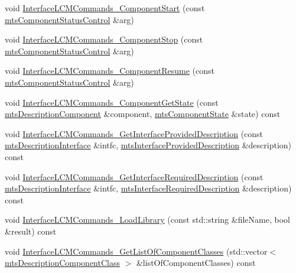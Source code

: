 \begin{DoxyCompactItemize}
\item 
void \hyperlink{classmts_manager_component_client_aa4241a0b7f26c01813bf25f3b720d4c8}{Interface\+L\+C\+M\+Commands\+\_\+\+Component\+Start} (const \hyperlink{classmts_component_status_control}{mts\+Component\+Status\+Control} \&arg)
\item 
void \hyperlink{classmts_manager_component_client_a96cc2f0e018d2ce86954aa69b1cd295a}{Interface\+L\+C\+M\+Commands\+\_\+\+Component\+Stop} (const \hyperlink{classmts_component_status_control}{mts\+Component\+Status\+Control} \&arg)
\item 
void \hyperlink{classmts_manager_component_client_a824231e5ba9b118b7c5386ff43a21ceb}{Interface\+L\+C\+M\+Commands\+\_\+\+Component\+Resume} (const \hyperlink{classmts_component_status_control}{mts\+Component\+Status\+Control} \&arg)
\item 
void \hyperlink{classmts_manager_component_client_a08e7f4f67ce5abb34704414d0a366630}{Interface\+L\+C\+M\+Commands\+\_\+\+Component\+Get\+State} (const \hyperlink{classmts_description_component}{mts\+Description\+Component} \&component, \hyperlink{classmts_component_state}{mts\+Component\+State} \&state) const 
\item 
void \hyperlink{classmts_manager_component_client_ae61750376c43687ea7699fd5c990b238}{Interface\+L\+C\+M\+Commands\+\_\+\+Get\+Interface\+Provided\+Description} (const \hyperlink{classmts_description_interface}{mts\+Description\+Interface} \&intfc, \hyperlink{classmts_interface_provided_description}{mts\+Interface\+Provided\+Description} \&description) const 
\item 
void \hyperlink{classmts_manager_component_client_a1cccf382e2bfdd52e8f3d03cfeaf0c9d}{Interface\+L\+C\+M\+Commands\+\_\+\+Get\+Interface\+Required\+Description} (const \hyperlink{classmts_description_interface}{mts\+Description\+Interface} \&intfc, \hyperlink{classmts_interface_required_description}{mts\+Interface\+Required\+Description} \&description) const 
\item 
void \hyperlink{classmts_manager_component_client_ab928599ba071eafb6250534a641b5296}{Interface\+L\+C\+M\+Commands\+\_\+\+Load\+Library} (const std\+::string \&file\+Name, bool \&result) const 
\item 
void \hyperlink{classmts_manager_component_client_a8e82f0a9027807c37594cb4f5ce4f499}{Interface\+L\+C\+M\+Commands\+\_\+\+Get\+List\+Of\+Component\+Classes} (std\+::vector$<$ \hyperlink{classmts_description_component_class}{mts\+Description\+Component\+Class} $>$ \&list\+Of\+Component\+Classes) const 

\end{DoxyCompactItemize}
